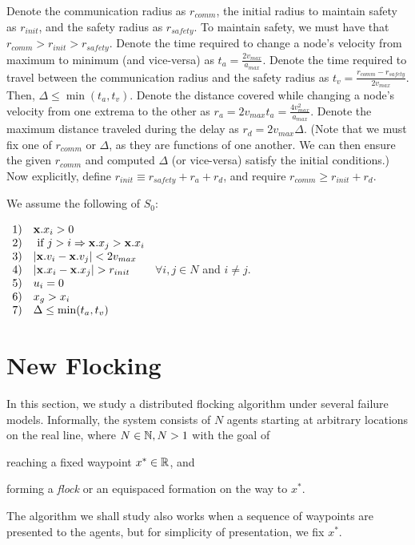 \documentclass[10pt, conference, compsocconf]{IEEEtran}
\begin{document}
Denote the communication radius as $r_{comm}$, the initial radius to maintain safety as $r_{init}$, and the safety radius as $\mathit{r_{safety}}$.  To maintain safety, we must have that $r_{comm} > r_{init} > \mathit{r_{safety}}$.
%
Denote the time required to change a node's velocity from maximum to minimum (and vice-versa) as $t_a = \frac{2v_{max}}{a_{max}}$.  Denote the time required to travel between the communication radius and the safety radius as $t_v = \frac{r_{comm} - \mathit{r_{safety}}}{2v_{max}}$.  Then, $\Delta \leq \min(t_a, t_v)$.
%
Denote the distance covered while changing a node's velocity from one extrema to the other as $r_a = 2v_{max}t_a = \frac{4v_{max}^2}{a_{max}}$.  Denote the maximum distance traveled during the delay as $r_d = 2v_{max}\Delta$.
%
(Note that we must fix one of $r_{comm}$ or $\Delta$, as they are functions of one another.  We can then ensure the given $r_{comm}$ and computed $\Delta$ (or vice-versa) satisfy the initial conditions.)
%
Now explicitly, define $r_{init} \equiv \mathit{r_{safety}} + r_a + r_d$, and require $r_{comm} \geq r_{init} + r_d$.

We assume the following of $S_0$:

$ \begin{array}{ll}
		1) & {\bf x}.x_i > 0 \\
		2) & \textrm{ if } j > i \Rightarrow {\bf x}.x_j > {\bf x}.x_i \\
		3) & \lvert{\bf x}.v_i - {\bf x}.v_{j}\rvert < 2v_{max} \\
		4) & \lvert{\bf x}.x_i - {\bf x}.x_{j}\rvert > r_{init} \\
		5) & u_i = 0 \\
		6) & x_g > x_i \\
		7) & \Delta \leq \min(t_a, t_v)
	\end{array} $
$\forall i, j \in N$ and $i \neq j$.

\section{New Flocking}
\label{sec:flocking}

In this section, we study a 
distributed flocking algorithm under several
failure models. 
%
Informally, the system consists of $N$ agents starting at arbitrary 
locations on the real line, where $N \in \naturals, N > 1$
with the goal of 
\begin{inparaenum}[(a)]
\item reaching a fixed waypoint $x^* \in \reals$, and 
\item forming a {\em flock\/} or an equispaced formation on the way to $x^*$.
\end{inparaenum}  
The algorithm we shall study also works when a sequence of waypoints 
are presented to the agents, but for simplicity of presentation, 
we fix $x^*$.
\end{document}
